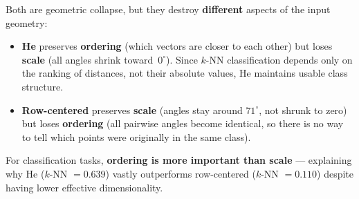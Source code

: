 Both are geometric collapse, but they destroy \textbf{different}
aspects of the input geometry:

\begin{itemize}
  \item \textbf{He} preserves \textbf{ordering} (which vectors are
        closer to each other) but loses \textbf{scale} (all angles
        shrink toward~$0^\circ$).  Since $k$-NN classification depends
        only on the ranking of distances, not their absolute values,
        He maintains usable class structure.

  \item \textbf{Row-centered} preserves \textbf{scale} (angles stay
        around $71^\circ$, not shrunk to zero) but loses
        \textbf{ordering} (all pairwise angles become identical,
        so there is no way to tell which points were originally
        in the same class).
\end{itemize}

For classification tasks, \textbf{ordering is more important than
scale} --- explaining why He ($k$-NN $= 0.639$) vastly outperforms
row-centered ($k$-NN $= 0.110$) despite having lower effective
dimensionality.
